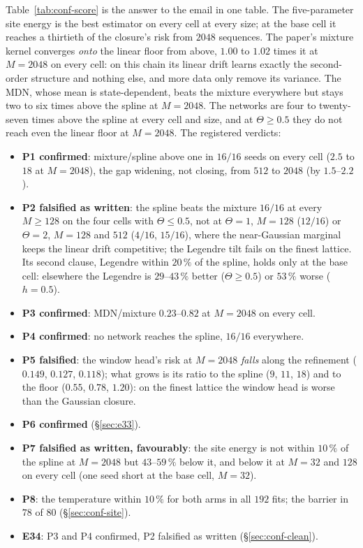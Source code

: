 \documentclass[10pt,a4paper]{article}
\newcommand{\Th}{\Theta}
\newcommand{\st}[1]{\textbf{#1}}
\theoremstyle{plain}
\theoremstyle{remark}
\begin{document}
Table~\ref{tab:conf-score} is the answer to the email in one table. The five-parameter site energy is the best
estimator on every cell at every size; at the base cell it reaches a thirtieth of the closure's risk from
$2048$ sequences. The paper's mixture kernel converges \emph{onto} the linear floor from above, $1.00$ to $1.02$
times it at $M=2048$ on every cell: on this chain its linear drift learns exactly the second-order structure
and nothing else, and more data only remove its variance. The MDN, whose mean is state-dependent, beats the
mixture everywhere but stays two to six times above the spline at $M=2048$. The networks are four to twenty-seven times above the spline at every cell and
size, and at $\Th\ge0.5$ they do not reach even the linear floor at $M=2048$. The registered verdicts:
\begin{itemize}[leftmargin=1.2em,itemsep=0.1em]
\item \st{P1 confirmed}: mixture/spline above one in $16/16$ seeds on every cell ($2.5$ to $18$ at $M=2048$), the
  gap widening, not closing, from $512$ to $2048$ (by $1.5$--$2.2$).
\item \st{P2 falsified as written}: the spline beats the mixture $16/16$ at every $M\ge128$ on the four cells with
  $\Th\le0.5$, not at $\Th=1$, $M=128$ ($12/16$) or $\Th=2$, $M=128$ and $512$ ($4/16$, $15/16$), where the
  near-Gaussian marginal keeps the linear drift competitive; the Legendre tilt fails on the finest lattice. Its
  second clause, Legendre within $20\,\%$ of the spline, holds only at the base cell: elsewhere the Legendre is
  $29$--$43\,\%$ better ($\Th\ge0.5$) or $53\,\%$ worse ($h=0.5$).
\item \st{P3 confirmed}: MDN/mixture $0.23$--$0.82$ at $M=2048$ on every cell.
\item \st{P4 confirmed}: no network reaches the spline, $16/16$ everywhere.
\item \st{P5 falsified}: the window head's risk at $M=2048$ \emph{falls} along the refinement ($0.149$, $0.127$, $0.118$);
  what grows is its ratio to the spline ($9$, $11$, $18$) and to the floor ($0.55$, $0.78$, $1.20$): on the finest
  lattice the window head is worse than the Gaussian closure.
\item \st{P6 confirmed} (\S\ref{sec:e33}).
\item \st{P7 falsified as written, favourably}: the site energy is not within $10\,\%$ of the spline at $M=2048$ but
  $43$--$59\,\%$ below it, and below it at $M=32$ and $128$ on every cell (one seed short at the base cell, $M=32$).
\item \st{P8}: the temperature within $10\,\%$ for both arms in all $192$ fits; the barrier in $78$ of $80$
  (\S\ref{sec:conf-site}).
\item \st{E34}: P3 and P4 confirmed, P2 falsified as written (\S\ref{sec:conf-clean}).
\end{itemize}
\end{document}
